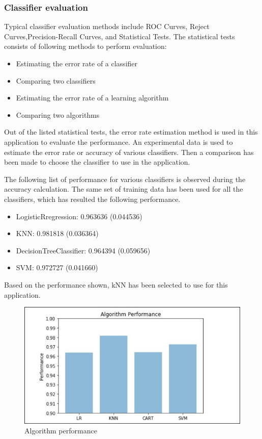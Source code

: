 \documentclass[sigconf]{acmart}
\begin{document}
\subsubsection{Classifier evaluation}
Typical classifier evaluation methods include ROC Curves, Reject Curves,Precision-Recall Curves, and Statistical Tests. The statistical tests consists of following methods to perform evaluation:
\begin{itemize}
    \item Estimating the error rate of a classifier
    \item Comparing two classifiers
    \item Estimating the error rate of a learning algorithm
    \item Comparing two algorithms
\end{itemize}

Out of the listed statistical tests, the error rate estimation method is used in this application to evaluate the performance. An experimental data is used to estimate the error rate or accuracy of various classifiers. Then a comparison has been made to choose the classifier to use in the application.

The following list of performance for various classifiers is observed during the accuracy calculation. The same set of training data has been used for all the classifiers, which has resulted the following performance.
\begin{itemize}
\item LogisticRregression: 0.963636 (0.044536)
\item KNN: 0.981818 (0.036364)
\item DecisionTreeClassifier: 0.964394 (0.059656)
\item SVM: 0.972727 (0.041660)
\end{itemize}

Based on the performance shown, kNN has been selected to use for this application.

\begin{figure}
\includegraphics[width=0.9\columnwidth]{images/algperformance}
\caption{Algorithm performance} \label{fig:Figure5}
\end{figure}
\end{document}

